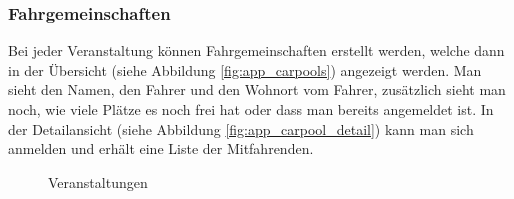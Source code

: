 \subsubsection{Fahrgemeinschaften}
Bei jeder Veranstaltung können Fahrgemeinschaften erstellt werden, welche dann in der Übersicht (siehe Abbildung \ref{fig:app_carpools}) angezeigt werden. Man sieht den Namen, den Fahrer und den Wohnort vom Fahrer, zusätzlich sieht man noch, wie viele Plätze es noch frei hat oder dass man bereits angemeldet ist. In der Detailansicht (siehe Abbildung \ref{fig:app_carpool_detail}) kann man sich anmelden und erhält eine Liste der Mitfahrenden.
\begin{figure}[ht]
\centering
{}
\label{fig:app_carpool_page}
\caption{Veranstaltungen}
\end{figure}

